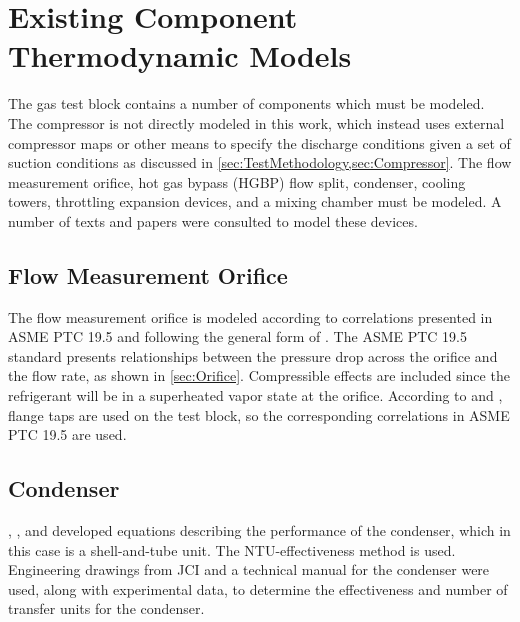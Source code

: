 
\section{Existing Component Thermodynamic Models}
The  gas test block contains a number of components which must be modeled. 
The compressor is not directly modeled in this work, 
which instead uses external compressor maps or other means 
to specify the discharge conditions given a set of suction conditions
as discussed in \cref{sec:TestMethodology,sec:Compressor}. 
The flow measurement orifice, hot gas bypass (HGBP)%
 flow split, condenser, cooling towers, 
throttling expansion devices, and a mixing chamber must be modeled. 
A number of texts and papers were consulted to model these devices.

\subsection{Flow Measurement Orifice}
The flow measurement orifice is modeled according to correlations presented in 
ASME PTC 19.5 \citep{ptc19} and following the general form of \citet{munson2009}. 
The ASME PTC 19.5 standard presents relationships between 
the pressure drop across the orifice and the flow rate, as shown in \cref{sec:Orifice}. 
Compressible effects are included since the refrigerant will be in a 
superheated vapor state at the orifice.
According to \citet{trevino2012} and \citet{flow1984}, flange taps
are used on the test block, so the corresponding correlations in ASME PTC 19.5
are used.

\subsection{Condenser}
\citet{incropera2007}, \citet{incropera1985}, and \citet{kays1984} 
developed equations describing the performance of the condenser, 
which in this case is a shell-and-tube unit. 
The NTU-effectiveness method is used. 
Engineering drawings from JCI \citep{cond1983} and a technical manual
for the condenser \citep{condman} were used, along with experimental data,
to determine the effectiveness and number of transfer units for the condenser.

